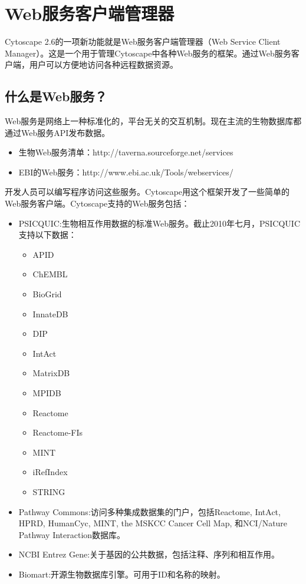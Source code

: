 \section{Web服务客户端管理器}
Cytoscape 2.6的一项新功能就是Web服务客户端管理器（Web Service Client Manager）。这是一个用于管理Cytoscape中各种Web服务的框架。通过Web服务客户端，用户可以方便地访问各种远程数据资源。

\subsection{什么是Web服务？}
Web服务是网络上一种标准化的，平台无关的交互机制。现在主流的生物数据库都通过Web服务API发布数据。
\begin{itemize}
\item 生物Web服务清单：http://taverna.sourceforge.net/services
\item EBI的Web服务：http://www.ebi.ac.uk/Tools/webservices/
\end{itemize}

开发人员可以编写程序访问这些服务。Cytoscape用这个框架开发了一些简单的Web服务客户端。Cytoscape支持的Web服务包括：
\begin{itemize}
\item PSICQUIC:生物相互作用数据的标准Web服务。截止2010年七月，PSICQUIC支持以下数据：
\begin{itemize}
\item  APID
\item    ChEMBL
\item    BioGrid
\item    InnateDB
\item    DIP
\item    IntAct
\item    MatrixDB
\item    MPIDB
\item    Reactome
\item    Reactome-FIs
\item    MINT
\item    iRefIndex
\item    STRING 
\end{itemize}
\item Pathway Commons:访问多种集成数据集的门户，包括Reactome, IntAct, HPRD, HumanCyc, MINT, the MSKCC Cancer Cell Map, 和NCI/Nature Pathway Interaction数据库。
\item NCBI Entrez Gene:关于基因的公共数据，包括注释、序列和相互作用。
\item Biomart:开源生物数据库引擎。可用于ID和名称的映射。
\end{itemize}

